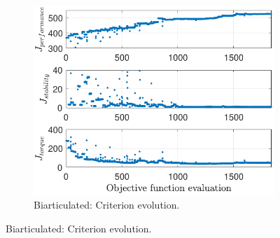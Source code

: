 \documentclass[letterpaper, 10 pt, conference]{ieeeconf}  %
\begin{document}
\begin{figure}[ht]
	\begin{subfigure}[t]{0.32\linewidth}
		\includegraphics[width=\linewidth]{bi/crit_high}
		\caption{Biarticulated: Criterion evolution.}
		\label{fig:bi_crit_high}
	\end{subfigure}
	
	\vspace{1mm}
	

\end{figure}
\end{document}
